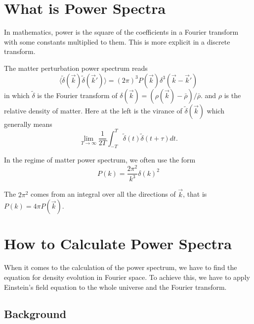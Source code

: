 \documentclass[12pt,a4paper]{book}
\begin{document}
\section{What is Power Spectra}

In mathematics, power is the square of the coefficients in a Fourier transform with some constants multiplied to them. This is more explicit in a discrete transform. 

The matter perturbation power spectrum reads
\begin{equation}
\langle \tilde \delta (\vec k) \tilde \delta (\vec k') \rangle = (2\pi)^3 P(\vec k) \delta^3(\vec k - \vec k')
\end{equation}
in which $\tilde\delta$ is the Fourier transform of $\delta(\vec k) = (\rho(\vec k) - \bar \rho)/\bar \rho$. and $\rho$ is the relative density of matter. Here at the left is the virance of $\tilde \delta(\vec k)$ which generally means
\begin{equation}
\lim _ {T\rightarrow\infty} \frac 1{2T} \int_{-T}^T\tilde \delta(t) \tilde \delta(t+\tau) dt.
\end{equation}

In the regime of matter power spectrum, we often use the form
\begin{equation}
P(k)=\frac{2\pi^2}{k^3}\delta(k)^2
\end{equation}

The $2\pi^2$ comes from an integral over all the directions of $\vec k$, that is $P(k) = 4\pi  P(\vec k)$.









\section{How to Calculate Power Spectra}


When it comes to the calculation of the power spectrum, we have to find the equation for density evolution in Fourier space. To achieve this, we have to apply Einstein's field equation to the whole universe and the Fourier transform.


\subsection{Background}
\end{document}
